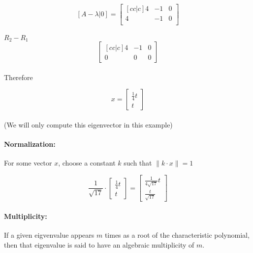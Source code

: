 \documentclass{article}
\begin{document}
\makeatletter
\renewcommand*\env@matrix[1][*\c@MaxMatrixCols c]{%
\hskip -\arraycolsep
\let\@ifnextchar\new@ifnextchar
\array{#1}}
\makeatother

\[
    [A-\lambda | 0] =
\begin{bmatrix}[cc|c]
    4 & -1 & 0\\
    4 & -1 & 0\\
\end{bmatrix}
\]
\paragraph{}$R_2 - R_1$
\[
\begin{bmatrix}[cc|c]
    4 & -1 & 0\\
    0 & 0 & 0
\end{bmatrix}
\]
\paragraph{}Therefore

\[
    x = 
    \begin{bmatrix}
        \frac{1}{4}t \\ t
    \end{bmatrix}
\]
\paragraph{}(We will only compute this eigenvector in this example)

\paragraph{Normalization:}For some vector $x$, choose a constant $k$ such that $\lVert k \cdot x\rVert = 1$

\[
    \frac{1}{\sqrt{17}} \cdot
    \begin{bmatrix}
        \frac{1}{4}t \\ t
    \end{bmatrix}
    = 
    \begin{bmatrix}
        \frac{1}{4\sqrt{17}}t \\ \frac{t}{\sqrt{17}}
    \end{bmatrix}
\]

\paragraph{Multiplicity:}If a given eigvenvalue appears $m$ times as a root of the
characteristic polynomial, then that eigenvalue is said to have an algebraic multiplicity of $m$.
\end{document}
